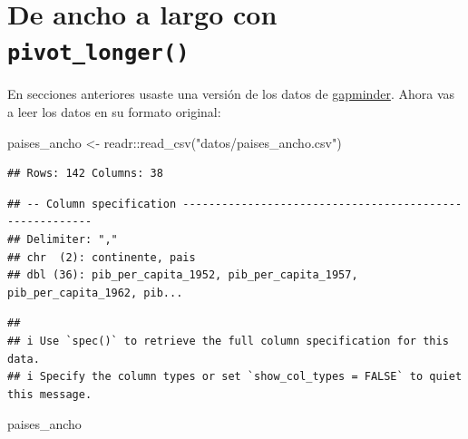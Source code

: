 \documentclass[
  openany]{book}
\newenvironment{Shaded}{\begin{snugshade}}{\end{snugshade}}
\newcommand{\FunctionTok}[1]{\textcolor[rgb]{0.00,0.00,0.00}{#1}}
\newcommand{\NormalTok}[1]{#1}
\newcommand{\OtherTok}[1]{\textcolor[rgb]{0.56,0.35,0.01}{#1}}
\newcommand{\SpecialCharTok}[1]{\textcolor[rgb]{0.00,0.00,0.00}{#1}}
\newcommand{\StringTok}[1]{\textcolor[rgb]{0.31,0.60,0.02}{#1}}
\begin{document}
\hypertarget{de-ancho-a-largo-con-pivot_longer}{%
\section{\texorpdfstring{De ancho a largo con \texttt{pivot\_longer()}}{De ancho a largo con pivot\_longer()}}\label{de-ancho-a-largo-con-pivot_longer}}

En secciones anteriores usaste una versión de los datos de \href{https://www.gapminder.org/}{gapminder}.
Ahora vas a leer los datos en su formato original:

\begin{Shaded}
\begin{Highlighting}[]
\NormalTok{paises\_ancho }\OtherTok{\textless{}{-}}\NormalTok{ readr}\SpecialCharTok{::}\FunctionTok{read\_csv}\NormalTok{(}\StringTok{"datos/paises\_ancho.csv"}\NormalTok{)}
\end{Highlighting}
\end{Shaded}

\begin{verbatim}
## Rows: 142 Columns: 38
\end{verbatim}

\begin{verbatim}
## -- Column specification --------------------------------------------------------
## Delimiter: ","
## chr  (2): continente, pais
## dbl (36): pib_per_capita_1952, pib_per_capita_1957, pib_per_capita_1962, pib...
\end{verbatim}

\begin{verbatim}
## 
## i Use `spec()` to retrieve the full column specification for this data.
## i Specify the column types or set `show_col_types = FALSE` to quiet this message.
\end{verbatim}

\begin{Shaded}
\begin{Highlighting}[]
\NormalTok{paises\_ancho}
\end{Highlighting}
\end{Shaded}
\end{document}
